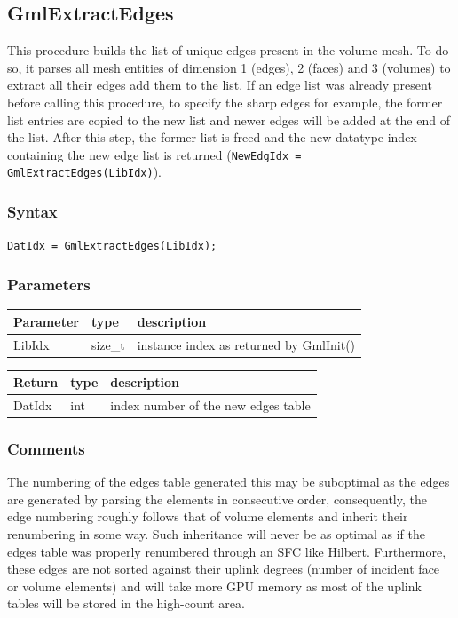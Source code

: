 \documentclass[a4paper,12pt]{article}
\begin{document}
\subsection{GmlExtractEdges}
This procedure builds the list of unique edges present in the volume mesh. To do so, it parses all mesh entities of dimension 1 (edges), 2 (faces) and 3 (volumes) to extract all their edges add them to the list. If an edge list was already present before calling this procedure, to specify the sharp edges for example, the former list entries are copied to the new list and newer edges will be added at the end of the list. After this step, the former list is freed and the new datatype index containing the new edge list is returned ({\tt NewEdgIdx = GmlExtractEdges(LibIdx)}).

\subsubsection*{Syntax}
{\tt DatIdx = GmlExtractEdges(LibIdx);}

\subsubsection*{Parameters}
\begin{tabular}{|m{2cm}|m{1.5cm}|m{10.5cm}|}
\hline
Parameter  & type    & description \\
\hline
LibIdx     & size\_t & instance index as returned by GmlInit() \\
\hline
\end{tabular}

\medskip

\begin{tabular}{|m{2cm}|m{1.5cm}|m{10.5cm}|}
\hline
Return     & type   & description \\
\hline
DatIdx     & int    & index number of the new edges table \\
\hline
\end{tabular}

\subsubsection*{Comments}
The numbering of the edges table generated this may be suboptimal as the edges are generated by parsing the elements in consecutive order, consequently, the edge numbering roughly follows that of volume elements and inherit their renumbering in some way. Such inheritance will never be as optimal as if the edges table was properly renumbered through an SFC like Hilbert. Furthermore, these edges are not sorted against their uplink degrees (number of incident face or volume elements) and will take more GPU memory as most of the uplink tables will be stored in the high-count area.
\end{document}
